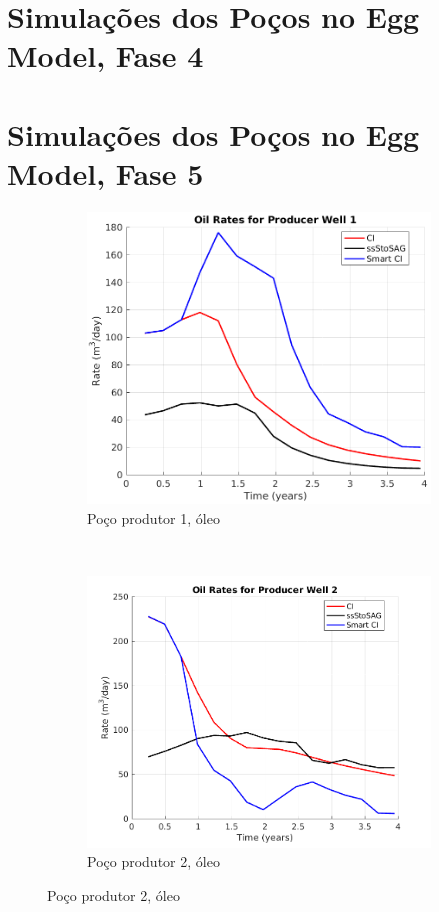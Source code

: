 \chapter{Simula\c{c}\~{o}es dos Po\c{c}os no Egg Model, Fase 4}


\chapter{Simula\c{c}\~{o}es dos Po\c{c}os no Egg Model, Fase 5}

\begin{figure}[!ht]
	\centering
	\begin{subfigure}[b]{.3\textwidth}
		\includegraphics[width=\textwidth]{figs/resultadosEgg/imgsim5/EGG_OilWell1_Zoom}
		\caption{Po\c{c}o produtor 1, \'{o}leo}
		\label{EGG5_OilWell1}
	\end{subfigure}
	~
	\begin{subfigure}[b]{.3\textwidth}
		\includegraphics[width=\textwidth]{figs/resultadosEgg/imgsim5/EGG_OilWell2_Zoom}
		\caption{Po\c{c}o produtor 2, \'{o}leo}
		\label{EGG5_OilWell2}
	\end{subfigure}
	

\end{figure}
